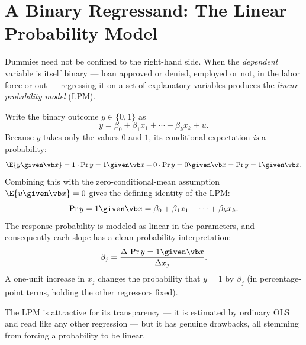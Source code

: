 \section{A Binary Regressand: The Linear Probability Model}

Dummies need not be confined to the right-hand side. When the \emph{dependent} variable is itself binary --- loan approved or denied, employed or not, in the labor force or out --- regressing it on a set of explanatory variables produces the \emph{linear probability model} (LPM).

Write the binary outcome $y \in \{0,1\}$ as
\[
y = \beta_0 + \beta_1 x_1 + \cdots + \beta_k x_k + u.
\]
Because $y$ takes only the values $0$ and $1$, its conditional expectation \emph{is} a probability:
\[
\E{y \given \vb x} = 1\cdot \Pr{y=1 \given \vb x} + 0\cdot \Pr{y=0 \given \vb x} = \Pr{y=1 \given \vb x}.
\]
Combining this with the zero-conditional-mean assumption $\E{u\given \vb x}=0$ gives the defining identity of the LPM:
\[
\Pr{y=1 \given \vb x} = \beta_0 + \beta_1 x_1 + \cdots + \beta_k x_k.
\]
The response probability is modeled as linear in the parameters, and consequently each slope has a clean probability interpretation:
\[
\beta_j = \frac{\Delta\, \Pr{y=1 \given \vb x}}{\Delta x_j}.
\]
A one-unit increase in $x_j$ changes the probability that $y=1$ by $\beta_j$ (in percentage-point terms, holding the other regressors fixed).


The LPM is attractive for its transparency --- it is estimated by ordinary OLS and read like any other regression --- but it has genuine drawbacks, all stemming from forcing a probability to be linear.

